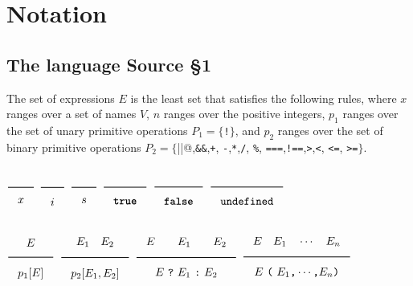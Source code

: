 

\newcommand{\Rule}[2]{\genfrac{}{}{0.7pt}{}{{\setlength{\fboxrule}{0pt}\setlength{\fboxsep}{3mm}\fbox{$#1$}}}{{\setlength{\fboxrule}{0pt}\setlength{\fboxsep}{3mm}\fbox{$#2$}}}}

\newcommand{\TruE}{\textbf{\texttt{true}}}
\newcommand{\FalsE}{\textbf{\texttt{false}}}
\newcommand{\Rc}{\texttt{\}}}
\newcommand{\Lc}{\texttt{\{}}
\newcommand{\Rp}{\texttt{)}}
\newcommand{\Lp}{\texttt{(}}
\newcommand{\Fun}{\textbf{\texttt{function}}}
\newcommand{\Let}{\textbf{\texttt{let}}}
\newcommand{\Return}{\textbf{\texttt{return}}}
\newcommand{\Const}{\textbf{\texttt{const}}}
\newcommand{\If}{\textbf{\texttt{if}}}
\newcommand{\Else}{\textbf{\texttt{else}}}
\newcommand{\Bool}{\texttt{bool}}
\newcommand{\Number}{\texttt{number}}
\newcommand{\String}{\texttt{string}}
\newcommand{\Undefined}{\texttt{undefined}}

\newtheorem{definition}{Definition}[section]




\section{Notation}  

\subsection{The language Source \S 1}

The set of expressions $E$ is the least set that satisfies the following rules, 
where $x$ ranges over a set of names $V$, $n$ ranges over the positive integers, 
$p_1$ ranges over the set of unary primitive operations 
$P_1 = \{$\verb#!#$\}$, and $p_2$ ranges over the set of binary 
primitive operations
$P_2 = \{$\verb@||@,\verb#&&#,\verb#+#,
\verb#-#,\verb#*#,\verb#/#, \verb#%#, \verb#===#,\verb#!==#,\verb#>#,\verb#<#, \verb#<=#, \verb#>=#$\}$.

$\Rule{}{x}$
\hfill 
$\Rule{}{i}$
\hfill 
$\Rule{}{s}$
\hfill 
$\Rule{}{\TruE}$
\hfill 
$\Rule{}{\FalsE}$
\hfill 
$\Rule{}{\Undefined}$

$\Rule{E}{p_1[E]}$
\hfill
$\Rule{E_1\quad E_2}{p_2[E_1, E_2]}$
\hfill
$\Rule{E \qquad E_1 \qquad E_2}{E\ \texttt{?}\ E_1\ \texttt{:}\ E_2}$
\hfill
$\Rule{E\quad E_1\quad \cdots \quad E_n}{E\ \Lp\ E_1\texttt{,}\cdots\texttt{,} E_n\Rp}$

